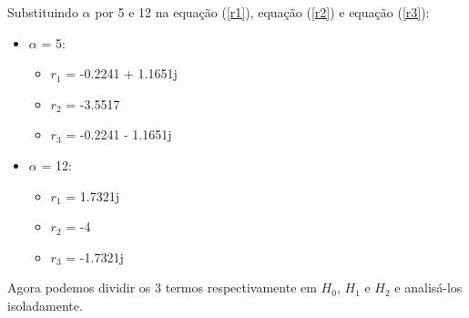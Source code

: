 \documentclass[a4paper,12pt,twoside]{article}
\begin{document}
\noindent Substituindo $\alpha$ por 5 e 12 na equação (\ref{r1}), equação (\ref{r2}) e equação (\ref{r3}):
\noindent\begin{itemize}
\item $\alpha$ = 5: 
    \begin{itemize}
         \item $r_{1}$ = -0.2241 + 1.1651j
         \item $r_{2}$ = -3.5517
         \item $r_{3}$ = -0.2241 - 1.1651j
    \end{itemize}
\end{itemize}


\noindent\begin{itemize}
    \item $\alpha$ = 12:
        \begin{itemize}
            \item $r_{1}$ = 1.7321j
             \item $r_{2}$ = -4
             \item $r_{3}$ = -1.7321j
        \end{itemize}
\end{itemize}


Agora podemos dividir os 3 termos respectivamente em $H_{0}$, $H_{1}$ e $H_{2}$ e analisá-los isoladamente.
\\
\end{document}
